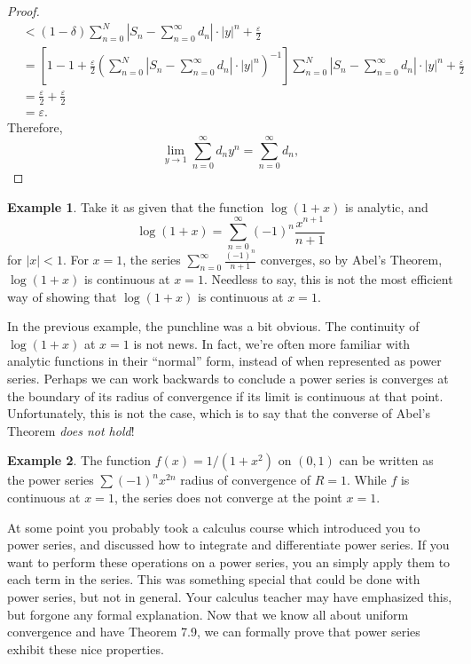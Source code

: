 \documentclass{article}
\theoremstyle{definition}
\newtheorem{example}{Example}[section]
\begin{document}
\begin{proof}
\begin{align*}
			&< (1-\delta)\sum_{n=0}^{N}\left\lvert S_n-\sum_{n=0}^{\infty}d_n \right\rvert\cdot|y|^n + \frac{\varepsilon}{2}\\
			& = \left[1-1 + \frac{\varepsilon}{2}\left(\sum_{n=0}^{N}\left\lvert S_n-\sum_{n=0}^{\infty}d_n \right\rvert\cdot|y|^n\right)^{-1}\right]\sum_{n=0}^{N}\left\lvert S_n-\sum_{n=0}^{\infty}d_n \right\rvert\cdot|y|^n + \frac{\varepsilon}{2}\\ & = 
			\frac{\varepsilon}{2} + \frac{\varepsilon}{2}\\
			& = \varepsilon.
		\end{align*}
		Therefore, $$ \lim\limits_{y\to 1}\sum_{n=0}^{\infty}d_ny^n= \sum_{n=0}^{\infty}d_n,$$
	\end{proof}
	
	\begin{example}
		Take it as given that the function $ \log(1+x) $ is analytic, and $$ \log(1+x)=\sum_{n=0}^{\infty}(-1)^{n}\frac{x^{n+1}}{n+1}$$ for $ |x|<1 $. For $ x=1 $,  the series $\sum_{n=0}^{\infty}\frac{(-1)^{n}}{n+1}$ converges, so by Abel's Theorem, $ \log(1+x) $ is continuous at $ x = 1 $. Needless to say, this is not the most efficient way of showing that $ \log(1+x) $ is continuous at $ x = 1 $.   
	\end{example}
	
	In the previous example, the punchline was a bit obvious. The continuity of $ \log(1+x) $ at $ x = 1 $ is not news. In fact, we're often more familiar with analytic functions in their ``normal'' form, instead of when represented as power series. Perhaps we can work backwards to conclude a power series is converges at the boundary of its radius of convergence if its limit is continuous at that point. Unfortunately, this is not the case, which is to say that the converse of Abel's Theorem \textit{does not hold}! 
	
	\begin{example}
		The function $ f(x)= 1/(1+x^2) $ on $ (0,1) $ can be written as the power series $ \sum(-1)^nx^{2n}$ radius of convergence of $ R = 1 $. While $ f $ is continuous at $ x = 1 $, the series does not converge at the point $ x = 1 $.
	\end{example}
	
	At some point you probably took a calculus course which introduced you to power series, and discussed how to integrate and differentiate power series. If you want to perform these operations on a power series, you an simply apply them to each term in the series. This was something special that could be done with power series, but not in general. Your calculus teacher may have emphasized this, but forgone any formal explanation. Now that we know all about uniform convergence and have Theorem 7.9, we can formally prove that power series exhibit these nice properties.  
	
\end{document}
